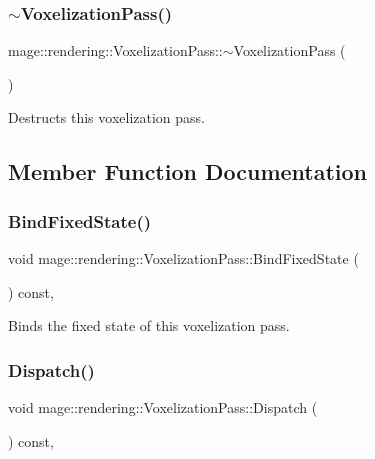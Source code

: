 \subsubsection{\texorpdfstring{$\sim$\+Voxelization\+Pass()}{~VoxelizationPass()}}
{\footnotesize\ttfamily mage\+::rendering\+::\+Voxelization\+Pass\+::$\sim$\+Voxelization\+Pass (\begin{DoxyParamCaption}{ }\end{DoxyParamCaption})\hspace{0.3cm}{\ttfamily [default]}}

Destructs this voxelization pass. 

\subsection{Member Function Documentation}
\mbox{\label{classmage_1_1rendering_1_1_voxelization_pass_ae69d6465ab918f12940339436fe56c56}} 
\subsubsection{\texorpdfstring{Bind\+Fixed\+State()}{BindFixedState()}}
{\footnotesize\ttfamily void mage\+::rendering\+::\+Voxelization\+Pass\+::\+Bind\+Fixed\+State (\begin{DoxyParamCaption}{ }\end{DoxyParamCaption}) const\hspace{0.3cm}{\ttfamily [private]}, {\ttfamily [noexcept]}}

Binds the fixed state of this voxelization pass. \mbox{\label{classmage_1_1rendering_1_1_voxelization_pass_a5026abcbe3aad3627e96ee055df8b842}} 
\subsubsection{\texorpdfstring{Dispatch()}{Dispatch()}}
{\footnotesize\ttfamily void mage\+::rendering\+::\+Voxelization\+Pass\+::\+Dispatch (\begin{DoxyParamCaption}{ }\end{DoxyParamCaption}) const\hspace{0.3cm}{\ttfamily [private]}, {\ttfamily [noexcept]}}

